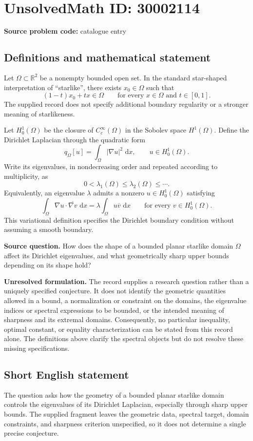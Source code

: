 \documentclass[11pt]{article}
\newcommand{\R}{\mathbb{R}}
\newcommand{\dd}{\,\mathrm{d}}
\begin{document}
\section*{UnsolvedMath ID: 30002114}
\textbf{Source problem code:} catalogue entry
\subsection{Definitions and mathematical statement}
Let \(\Omega\subset\R^2\) be a nonempty bounded open set. In the standard star-shaped interpretation of ``starlike'', there exists \(x_0\in\Omega\) such that
\[
(1-t)x_0+tx\in\Omega\qquad\text{for every }x\in\Omega\text{ and }t\in[0,1].
\]
The supplied record does not specify additional boundary regularity or a stronger meaning of starlikeness.

Let \(H_0^1(\Omega)\) be the closure of \(C_c^\infty(\Omega)\) in the Sobolev space \(H^1(\Omega)\). Define the Dirichlet Laplacian through the quadratic form
\[
q_\Omega[u]=\int_\Omega |\nabla u|^2\,\dd x,
\qquad u\in H_0^1(\Omega).
\]
Write its eigenvalues, in nondecreasing order and repeated according to multiplicity, as
\[
0<\lambda_1(\Omega)\leq\lambda_2(\Omega)\leq\cdots.
\]
Equivalently, an eigenvalue \(\lambda\) admits a nonzero \(u\in H_0^1(\Omega)\) satisfying
\[
\int_\Omega\nabla u\cdot\overline{\nabla v}\,\dd x
=\lambda\int_\Omega u\overline v\,\dd x
\qquad\text{for every }v\in H_0^1(\Omega).
\]
This variational definition specifies the Dirichlet boundary condition without assuming a smooth boundary.

\textbf{Source question.} How does the shape of a bounded planar starlike domain \(\Omega\) affect its Dirichlet eigenvalues, and what geometrically sharp upper bounds depending on its shape hold?

\textbf{Unresolved formulation.} The record supplies a research question rather than a uniquely specified conjecture. It does not identify the geometric quantities allowed in a bound, a normalization or constraint on the domains, the eigenvalue indices or spectral expressions to be bounded, or the intended meaning of sharpness and its extremal domains. Consequently, no particular inequality, optimal constant, or equality characterization can be stated from this record alone. The definitions above clarify the spectral objects but do not resolve these missing specifications.
\subsection{Short English statement}
The question asks how the geometry of a bounded planar starlike domain controls the eigenvalues of its Dirichlet Laplacian, especially through sharp upper bounds. The supplied fragment leaves the geometric data, spectral target, domain constraints, and sharpness criterion unspecified, so it does not determine a single precise conjecture.
\end{document}
